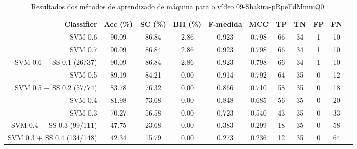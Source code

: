 \begin{table}[!htb]
\centering
\caption{Resultados dos métodos de aprendizado de máquina para o vídeo 09-Shakira-pRpeEdMmmQ0.}
\label{tab:09-Shakira-pRpeEdMmmQ0}
\begin{tabular}{r|c|c|c|c|c|c|c|c|c|c}
\hline\hline
Classifier & Acc (\%) & SC (\%) & BH (\%) & F-medida & MCC & TP & TN & FP & FN \\ \hline
SVM 0.6 & 90.09 & 86.84 & 2.86 & 0.923 & 0.798 & 66 & 34 & 1 & 10 \\ 
SVM 0.7 & 90.09 & 86.84 & 2.86 & 0.923 & 0.798 & 66 & 34 & 1 & 10 \\ 
SVM 0.6 + SS 0.1 (26/37) & 90.09 & 86.84 & 2.86 & 0.923 & 0.798 & 66 & 34 & 1 & 10 \\ 
SVM 0.5 & 89.19 & 84.21 & 0.00 & 0.914 & 0.792 & 64 & 35 & 0 & 12 \\ 
SVM 0.5 + SS 0.2 (57/74) & 83.78 & 76.32 & 0.00 & 0.866 & 0.710 & 58 & 35 & 0 & 18 \\ 
SVM 0.4 & 81.98 & 73.68 & 0.00 & 0.848 & 0.685 & 56 & 35 & 0 & 20 \\ 
SVM 0.3 & 70.27 & 56.58 & 0.00 & 0.723 & 0.540 & 43 & 35 & 0 & 33 \\ 
SVM 0.4 + SS 0.3 (99/111) & 47.75 & 23.68 & 0.00 & 0.383 & 0.299 & 18 & 35 & 0 & 58 \\ 
SVM 0.3 + SS 0.4 (134/148) & 42.34 & 15.79 & 0.00 & 0.273 & 0.236 & 12 & 35 & 0 & 64 \\ 
\hline\hline
\end{tabular}
\end{table}
